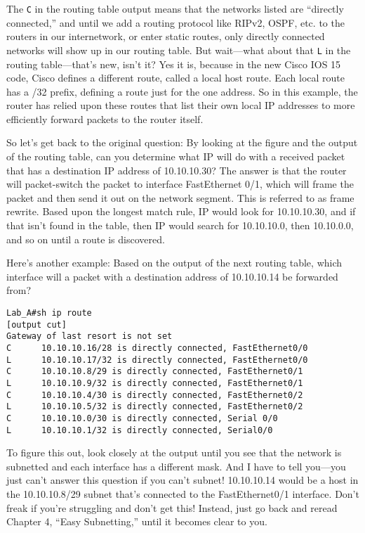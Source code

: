 The \texttt{C} in the routing table output means that the networks
listed are ``directly connected,'' and until we add a routing protocol
like RIPv2, OSPF, etc. to the routers in our internetwork, or enter
static routes, only directly connected networks will show up in our
routing table. But wait---what about that \texttt{L} in the routing
table---that's new, isn't it? Yes it is, because in the new Cisco IOS 15
code, Cisco defines a different route, called a local host route. Each
local route has a /32 prefix, defining a route just for the one address.
So in this example, the router has relied upon these routes that list
their own local IP addresses to more efficiently forward packets to the
router itself.

\protect\hypertarget{c09.xhtmlux5cux23Page_361}{}{}So let's get back to
the original question: By looking at the figure and the output of the
routing table, can you determine what IP will do with a received packet
that has a destination IP address of 10.10.10.30? The answer is that the
router will packet-switch the packet to interface FastEthernet 0/1,
which will frame the packet and then send it out on the network segment.
This is referred to as frame rewrite. Based upon the longest match rule,
IP would look for 10.10.10.30, and if that isn't found in the table,
then IP would search for 10.10.10.0, then 10.10.0.0, and so on until a
route is discovered.

Here's another example: Based on the output of the next routing table,
which interface will a packet with a destination address of 10.10.10.14
be forwarded from?

\begin{verbatim}
Lab_A#sh ip route
[output cut]
Gateway of last resort is not set
C      10.10.10.16/28 is directly connected, FastEthernet0/0
L      10.10.10.17/32 is directly connected, FastEthernet0/0
C      10.10.10.8/29 is directly connected, FastEthernet0/1
L      10.10.10.9/32 is directly connected, FastEthernet0/1
C      10.10.10.4/30 is directly connected, FastEthernet0/2
L      10.10.10.5/32 is directly connected, FastEthernet0/2
C      10.10.10.0/30 is directly connected, Serial 0/0
L      10.10.10.1/32 is directly connected, Serial0/0
\end{verbatim}

To figure this out, look closely at the output until you see that the
network is subnetted and each interface has a different mask. And I have
to tell you---you just can't answer this question if you can't subnet!
10.10.10.14 would be a host in the 10.10.10.8/29 subnet that's connected
to the FastEthernet0/1 interface. Don't freak if you're struggling and
don't get this! Instead, just go back and reread Chapter 4, ``Easy
Subnetting,'' until it becomes clear to you.

